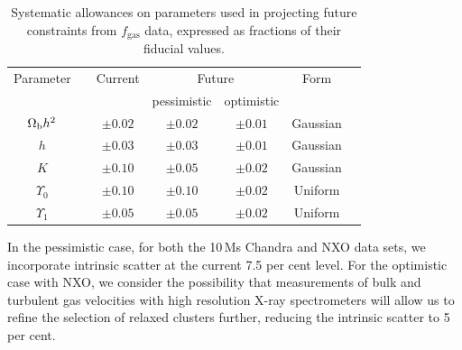 \documentclass[useAMS,usenatbib,usegraphicx]{mn2e}
\newcommand*{\mysub}[2]{\ensuremath{#1_{\mathrm{#2}}}}
\newcommand*{\fgas}{\mysub{f}{gas}}
\begin{document}
\begin{table}
  \begin{center}
    \caption{Systematic allowances on parameters used in projecting future constraints from \fgas{} data, expressed as fractions of their fiducial values.}
    \label{tab:sys}
    \begin{tabular}{ c c c c c c c }
      \hline
      Parameter            & & Current             & \multicolumn{2}{c}{Future}   &  Form    \\
      & & & pessimistic & optimistic & \\
      \hline
      $\Omega_{\rm b}h^2$ & &  $\pm0.02$  & $\pm0.02$&$\pm0.01$   & Gaussian \\
      $h$                 & &  $\pm0.03$  & $\pm0.03$&$\pm0.01$   & Gaussian\smallskip\\
      $K$                 & &  $\pm0.10$  & $\pm0.05$&$\pm0.02$   & Gaussian \\
      $\Upsilon_0$        & &  $\pm0.10$  & $\pm0.10$ &$\pm0.02$   & Uniform  \\
      $\Upsilon_1$ & &  $\pm0.05$  & $\pm0.05$&$\pm0.02$   & Uniform  \\
      \hline                      
    \end{tabular}
  \end{center}
\end{table}

In the pessimistic case, for both the 10\,Ms Chandra and NXO data sets, we incorporate intrinsic scatter at the current 7.5 per cent level. For the optimistic case with NXO, we consider the possibility that measurements of bulk and turbulent gas velocities with high resolution X-ray spectrometers will allow us to refine the selection of relaxed clusters further, reducing the intrinsic scatter to 5 per cent.
\end{document}
